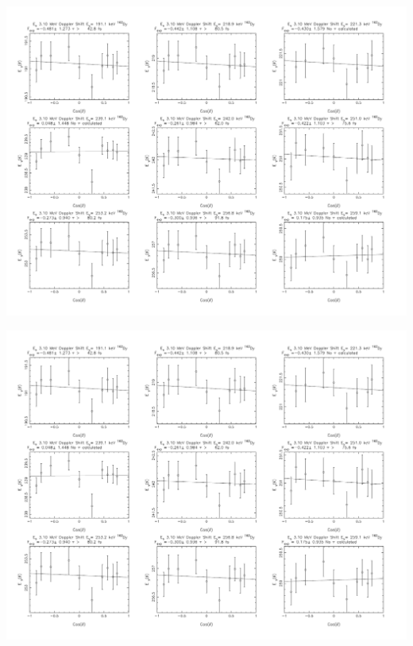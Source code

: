 \begin{center}
\includegraphics[page=25,angle=90,height=0.95\textheight]{162Dy_ftau_310_HE_n.pdf}
\end{center}
\begin{center}
\includegraphics[page=26,angle=90,height=0.95\textheight]{162Dy_ftau_310_HE_n.pdf}
\end{center}
